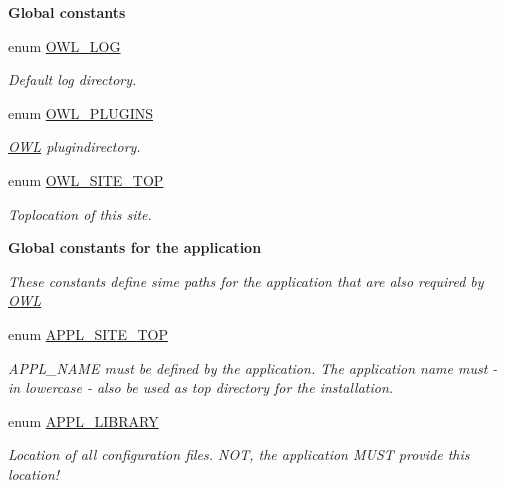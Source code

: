 \begin{Indent}{\bf Global constants}
\begin{DoxyCompactItemize}
enum \hyperlink{OWLloader_8php_ae3fe8a897196b3cb98b8827a9a940ccb}{OWL\_\-LOG} 
\begin{DoxyCompactList}\small\item\em Default log directory. \item\end{DoxyCompactList}\item 
enum \hyperlink{OWLloader_8php_acb1e6e914bd3c0c96fc20ae6bb3a8a99}{OWL\_\-PLUGINS} 
\begin{DoxyCompactList}\small\item\em \hyperlink{classOWL}{OWL} plugindirectory. \item\end{DoxyCompactList}\item 
enum \hyperlink{OWLloader_8php_a462de9ae02e394313337afac5d1a5f95}{OWL\_\-SITE\_\-TOP} 
\begin{DoxyCompactList}\small\item\em Toplocation of this site. \item\end{DoxyCompactList}\end{DoxyCompactItemize}
\end{Indent}
\begin{Indent}{\bf Global constants for the application}\par
{\em \label{_amgrp3ebb069601fef11bcb0ba759cb17b4d6}
 These constants define sime paths for the application that are also required by \hyperlink{classOWL}{OWL} }\begin{DoxyCompactItemize}
\item 
enum \hyperlink{OWLloader_8php_a17a0c6fb6eda7d05081d16bc519c97b5}{APPL\_\-SITE\_\-TOP} 
\begin{DoxyCompactList}\small\item\em APPL\_\-NAME must be defined by the application. The application name must -\/ in lowercase -\/ also be used as top directory for the installation. \item\end{DoxyCompactList}\item 
enum \hyperlink{OWLloader_8php_a1b19bb6ffba1d1e7871092e086cc4e94}{APPL\_\-LIBRARY} 
\begin{DoxyCompactList}\small\item\em Location of all configuration files. NOT, the application MUST provide this location! \item\end{DoxyCompactList}\end{DoxyCompactItemize}
\end{Indent}
